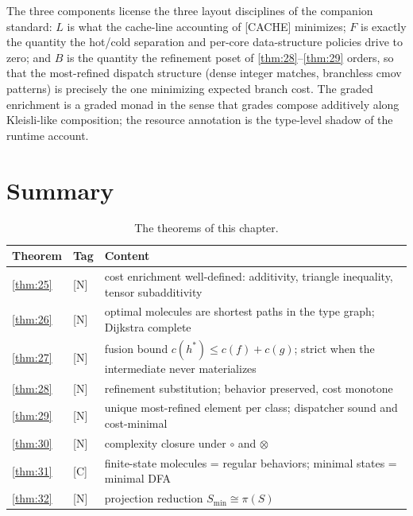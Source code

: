 \begin{remark}
The three components license the three layout disciplines of the
companion standard: $L$ is what the cache-line accounting of [CACHE]
minimizes; $F$ is exactly the quantity the hot/cold separation and
per-core data-structure policies drive to zero; and $B$ is the quantity
the refinement poset of \ref{thm:28}--\ref{thm:29} orders, so that the
most-refined dispatch structure (dense integer matches, branchless
cmov patterns) is precisely the one minimizing expected branch cost.
The graded enrichment is a graded monad in the sense that grades
compose additively along Kleisli-like composition; the resource
annotation is the type-level shadow of the runtime account.
\end{remark}
\section{Summary}\label{sec:enrich-summary}

\begin{table}[htbp]
\centering
\begin{tabular}{@{}lll@{}}
\toprule
\textbf{Theorem} & \textbf{Tag} & \textbf{Content} \\
\midrule
\autoref{thm:25} & [N] & cost enrichment well-defined: additivity, triangle inequality, tensor subadditivity \\
\autoref{thm:26} & [N] & optimal molecules are shortest paths in the type graph; Dijkstra complete \\
\autoref{thm:27} & [N] & fusion bound $c (h^{*}) \le c (f) + c (g)$; strict when the intermediate never materializes \\
\autoref{thm:28} & [N] & refinement substitution; behavior preserved, cost monotone \\
\autoref{thm:29} & [N] & unique most-refined element per class; dispatcher sound and cost-minimal \\
\autoref{thm:30} & [N] & complexity closure under $\circ$ and $\otimes$ \\
\autoref{thm:31} & [C] & finite-state molecules = regular behaviors; minimal states = minimal DFA \\
\autoref{thm:32} & [N] & projection reduction $S_{\min} \cong \pi (S)$ \\
\bottomrule
\end{tabular}
\caption{The theorems of this chapter.}
\label{tab:enrich}
\end{table}

